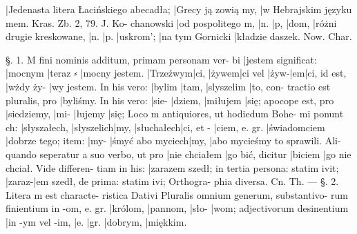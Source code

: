 ﻿%

|{Jedenasta litera Łacińskiego abecadła}; |{Grecy ją zowią} my,
|{w Hebrajskim języku} mem. Kras. Zb. 2, 79. J. Ko-
chanowski |{od pospolitego} m, |{n}. |{p}, |{do}m, |{różni drugie
kreskowane}, |{n}. |{p}. |{uskro}m'; |{na tym} Gornicki |{kładzie
daszek}. Now. Char.

§⃔. 1. M fini nominis additum, primam personam ver-
bi |{jestem} significat: |{mocny}m |{teraz} ⸗ |{mocny} jestem.
|{Trzeźwy}m|{ci}, |{żywe}m|{ci} vel |{żyw}-|{e}m|{ci}, id est, |{wżdy ży}-
|{wy} jestem. In his vero: |{byli}m |{tam}, |{slyszeli}m |{to}, con-
tractio est pluralis, pro |{byliś}my. In his vero: |{sie}-
|{dzie}m, |{miłuje}m |{się}; apocope est, pro |{siedzie}my, |{mi}-
|{łuje}my |{się}; Loco m antiquiores, ut hodiedum Bohe-
mi ponunt ch: |{słyszałe}ch, |{słyszeli}ch|{my}, |{słuchałe}ch|{ci},
et - |{ciem}, e. gr. |{świadom}ciem |{dobrze tego}; item: |{my}-
|{śmyć abo mycie}ch|{my}, |{abo mycieśmy to sprawili}. Ali-
quando seperatur a suo verbo, ut pro |{nie chciał}em
|{go bić}, dicitur |{bicie}m |{go nie chciał}. Vide differen-
tiam in his: |{zarazem szedł}; in tertia persona: statim
ivit; |{zaraz}-|{em szedł}, de prima: statim ivi; Orthogra-
phia diversa. Cn. Th. — {§}. 2. Litera m est characte-    
ristica Dativi Pluralis omnium generum, substantivo-
rum finientium in -om, e. gr. |{królom}, |{pannom}, |{sło}-
|{wom}; adjectivorum desinentium |{in} -ym vel -im, |{e}.
|{gr}. |{dobrym}, |{miękkim}. 

\endinput

Jedenasta litera Łacińskiego abecadło; Grecy ją zowią my,
w Hebrajskim języku mem. Kras. Zb. 2, 79. J. Ko-
chanowski od pospolitego m, 7:. p, dom, róźni drugie
kre'skowane, 12. p. uskrom'; na tym Gornicki kładzie
daszek. Now. Char.
§. l. M fini nominis additum', primam personam Ver-
bi jestem signiñcat: mocnym teraz - mocny jestem.
Trzeźwymcź, źywemcź vel żyw-emeil, id est, wżdy źy-
wy jestem. In his vero: bylim tam, slyszelim to, con-
›tractio est pluralis, pro byliśmy. In bis vero: sie-
dziem, mili/zjem się; apocope est, pro siedziemy, mi-
lujemy się. Loco m antiquiores, ut hodiedum Bohe-
mi ponunt ch: słyszałecb, słyszelichmy, słuchałecbeź,
et-cźem, e. gr. świadomćiem dobrze tego; item: my-
s'myć abo myez'ecbmy, abo myeies'my to sprawili. Ali-
quando seperatur a suo verbo, ut pro nie chciałem
go bić, dicitur biciem go nie chciał. Vide differen-
tiam in his: zarazem szedl; in tertia persona: statim
ivit; zaraz-em szedł, de prima: statim ivi; Orthogra-
phia diversa. Cn. Tb. - 2. Litera m est characte-
1000 !!!!!!!!!!!!!!!!!!!!!!!!!!!!!!!!!!!!!!!!!!!!     
ristica Dativi Pluralis omnium generum, substantivo-
rum ñnientium in -om, e. gr. królom, pannom, sło-
wom; adjectivorum desinen-tium in -ym vel -im, e.
gr. dobrym, miękkim. 


